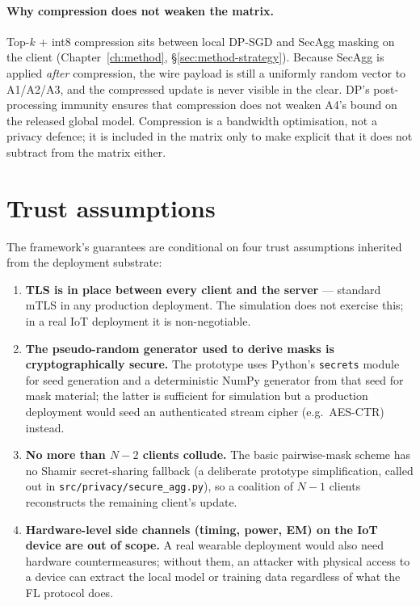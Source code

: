 \documentclass[11pt,a4paper]{report}
\begin{document}
\paragraph{Why compression does not weaken the matrix.}
Top-$k$ + int8 compression sits between local DP-SGD and SecAgg masking on
the client (Chapter~\ref{ch:method}, \S\ref{sec:method-strategy}). Because
SecAgg is applied \emph{after} compression, the wire payload is still a
uniformly random vector to A1/A2/A3, and the compressed update is never
visible in the clear. DP's post-processing immunity ensures that compression
does not weaken A4's bound on the released global model. Compression is a
bandwidth optimisation, not a privacy defence; it is included in the matrix
only to make explicit that it does not subtract from the matrix either.

\section{Trust assumptions}\label{sec:trust}

The framework's guarantees are conditional on four trust assumptions
inherited from the deployment substrate:

\begin{enumerate}[leftmargin=*]
  \item \textbf{TLS is in place between every client and the server} ---
  standard mTLS in any production deployment. The simulation does not
  exercise this; in a real IoT deployment it is non-negotiable.
  \item \textbf{The pseudo-random generator used to derive masks is
  cryptographically secure.} The prototype uses Python's \texttt{secrets}
  module for seed generation and a deterministic NumPy generator from that
  seed for mask material; the latter is sufficient for simulation but a
  production deployment would seed an authenticated stream cipher (e.g.\
  AES-CTR) instead.
  \item \textbf{No more than $N - 2$ clients collude.} The basic
  pairwise-mask scheme has no Shamir secret-sharing fallback (a deliberate
  prototype simplification, called out in
  \texttt{src/privacy/secure\_agg.py}), so a coalition of $N - 1$ clients
  reconstructs the remaining client's update.
  \item \textbf{Hardware-level side channels (timing, power, EM) on the IoT
  device are out of scope.} A real wearable deployment would also need
  hardware countermeasures; without them, an attacker with physical access
  to a device can extract the local model or training data regardless of
  what the FL protocol does.
\end{enumerate}
\end{document}
